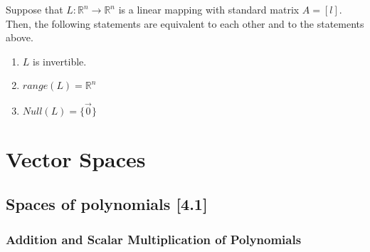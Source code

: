 \documentclass[a4paper,9pt]{extarticle}
\begin{document}
\begin{multicols*}{2}
Suppose that $L: \mathbb{R}^n \to \mathbb{R}^n$ is a linear mapping with standard matrix $A = [l]$. Then, the following statements are equivalent to each other and to the statements above.

\begin{enumerate}[label=\bfseries (\arabic*)] \itemsep0pt \parskip0pt 
    \setcounter{enumi}{6}
    \item $L$ is invertible.
    \item $range(L) = \mathbb{R}^n$
    \item $Null(L) = \{\vec{0}\}$
\end{enumerate}







\section{Vector Spaces}

\subsection{Spaces of polynomials [4.1]}

\subsubsection{Addition and Scalar Multiplication of Polynomials}


\end{multicols*}
\end{document}
